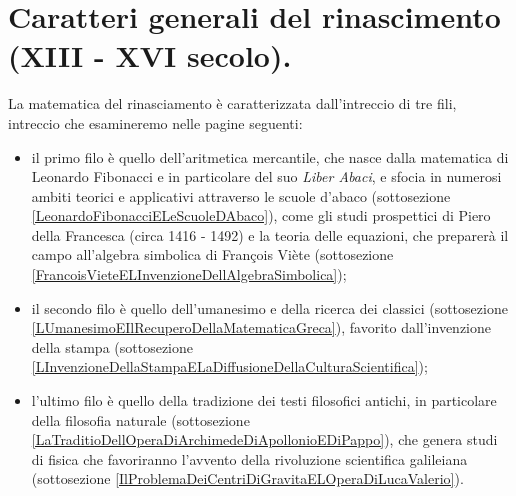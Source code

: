 \section{Caratteri generali del rinascimento (XIII - XVI secolo).}\label{CaratteriGeneraliDelRinascimento}
\par La matematica del rinasciamento \`e caratterizzata dall'intreccio di tre fili, intreccio che esamineremo nelle pagine seguenti:
\begin{itemize}
	\item il primo filo \`e quello dell'aritmetica mercantile, che nasce dalla matematica di Leonardo Fibonacci e in particolare del suo \textit{Liber Abaci}, e sfocia in numerosi ambiti teorici e applicativi attraverso le scuole d'abaco (sottosezione \ref{LeonardoFibonacciELeScuoleDAbaco}), come gli studi prospettici di Piero della Francesca (circa 1416 - 1492) e la teoria delle equazioni, che preparer\`a il campo all'algebra simbolica di Fran\c{c}ois Vi\`ete (sottosezione \ref{FrancoisVieteELInvenzioneDellAlgebraSimbolica});
	\item il secondo filo \`e quello dell'umanesimo e della ricerca dei classici (sottosezione \ref{LUmanesimoEIlRecuperoDellaMatematicaGreca}), favorito dall'invenzione della stampa (sottosezione \ref{LInvenzioneDellaStampaELaDiffusioneDellaCulturaScientifica});
	\item l'ultimo filo \`e quello della tradizione dei testi filosofici antichi, in particolare della filosofia naturale (sottosezione \ref{LaTraditioDellOperaDiArchimedeDiApollonioEDiPappo}), che genera studi di fisica che favoriranno l'avvento della rivoluzione scientifica galileiana (sottosezione \ref{IlProblemaDeiCentriDiGravitaELOperaDiLucaValerio}).
\end{itemize}



